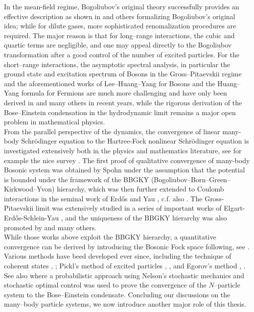 In the mean-field regime, Bogoliubov's original theory successfully provides an effective description as shown in \cite{Serfaty2009} and others formalizing Bogoliubov's original idea; while for dilute gases, more sophisticated renomalization procedures are required. The major reason is that for long--range interactions, the cubic and quartic terms are negligible, and one may appeal directly to the Bogoliubov transformation after a good control of the number of excited particles. For the short--range interactions, the asymptotic spectral analysis, in particular the ground state and excitation spectrum of Bosons in the Gross--Pitaevskii regime and the aforementioned works of Lee--Huang--Yang for Bosons and the Huang--Yang formula for Fermions are much more challenging and have only been derived in  \cite{boccato2019bogoliubov,haberberger2023free,giacomelli2024huang,fournais2023energy} and many others in recent years, while the rigorous derivation of the Bose--Einstein condensation in the hydrodynamic limit remains a major open problem in mathematical physics.\\

From the parallel perspective of the dynamics, the convergence of linear many-body Schr{\"o}dinger equation to the
Hartree-Fock nonlinear Schr{\"o}dinger equation is investigated extensively both in the physics
and mathematics literature, see for example the nice survey {\cite{R21}}. The first proof of
qualitative convergence of many-body Bosonic system was obtained by Spohn
{\cite{S80}} under the assumption that the potential is bounded under the
framework of the BBGKY (Bogoliubov--Born--Green--Kirkwood--Yvon)
hierarchy, which was then further extended to Coulomb interactions in the
seminal work of Erd{\H o}s and Yau {\cite{EY01}}, c.f. also {\cite{BGM00}}.
The Gross-Pitaevskii limit was extensively studied in a series of important
works of Elgart-Erd{\H o}s-Schlein-Yau {\cite{EESY06,EESY062,ESY07,ESY09,ESY10}}, and the uniqueness of the
BBGKY hierarchy was also promoted by {\cite{KM08, CP14,CH16}} and many others. \\

While those works above exploit the BBGKY
hierarchy, a quantitative convergence can be derived by introducing the
Bosonic Fock space following, see {\cite{H74}}. Various methods have beed
developed ever since, including the technique of coherent states
{\cite{GV79-1}}, {\cite{GV79-2}}; Pickl's method of excited particles
{\cite{KP10}}, {\cite{P11}}, {\cite{P15}} and Egorov's method {\cite{FGS07}},
{\cite{FKP07}}. See also
{\cite{EntropyDeVecchi1,EntropyDeVecchi2,EntropyDeVecchi3}} where a
probabilistic approach using Nelson's stochastic mechanics and stochastic
optimal control was used to prove the convergence of the $N$--particle system
to the Bose--Einstein condensate. Concluding our discussions on the many--body particle systems, we now introduce another major role of this thesis.

